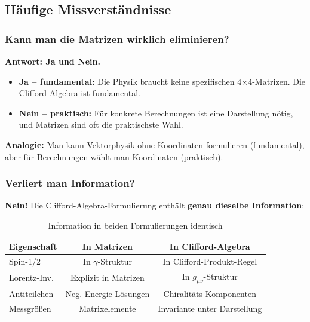 \subsection{Häufige Missverständnisse}
\label{subsec:common_misconceptions}

\subsubsection{Kann man die Matrizen wirklich eliminieren?}

\textbf{Antwort: Ja und Nein.}

\begin{itemize}
	\item \textbf{Ja -- fundamental:} Die Physik braucht keine spezifischen 
	4×4-Matrizen. Die Clifford-Algebra ist fundamental.
	
	\item \textbf{Nein -- praktisch:} Für konkrete Berechnungen ist eine Darstellung 
	nötig, und Matrizen sind oft die praktischste Wahl.
\end{itemize}

\textbf{Analogie:} Man kann Vektorphysik ohne Koordinaten formulieren (fundamental), 
aber für Berechnungen wählt man Koordinaten (praktisch).

\subsubsection{Verliert man Information?}

\textbf{Nein!} Die Clifford-Algebra-Formulierung enthält \textbf{genau dieselbe 
	Information}:

\begin{table}[h]
	\centering
	\begin{tabular}{lcc}
		\toprule
		\textbf{Eigenschaft} & \textbf{In Matrizen} & \textbf{In Clifford-Algebra} \\
		\midrule
		Spin-1/2 & In $\gamma$-Struktur & In Clifford-Produkt-Regel \\
		Lorentz-Inv. & Explizit in Matrizen & In $g_{\mu\nu}$-Struktur \\
		Antiteilchen & Neg. Energie-Lösungen & Chiralitäts-Komponenten \\
		Messgrößen & Matrixelemente & Invariante unter Darstellung \\
		\bottomrule
	\end{tabular}
	\caption{Information in beiden Formulierungen identisch}
\end{table}

